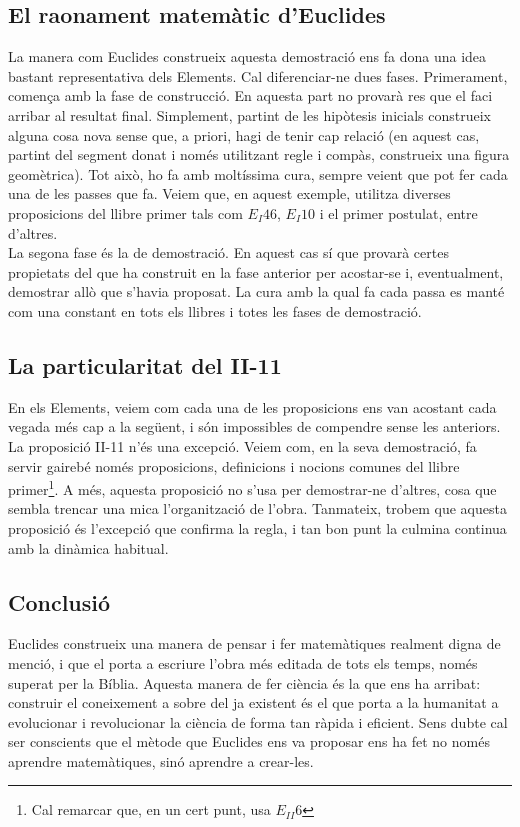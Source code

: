\documentclass[a4paper, 11pt]{article}
\begin{document}
\subsection*{El raonament matemàtic d'Euclides}
La manera com Euclides construeix aquesta demostració ens fa dona una idea bastant representativa dels Elements. Cal
diferenciar-ne dues fases. Primerament, comença amb la fase de construcció. En aquesta part no provarà res que el faci
arribar al resultat final. Simplement, partint de les hipòtesis inicials construeix alguna cosa nova sense que, a
priori, hagi de tenir cap relació (en aquest cas, partint del segment donat i només utilitzant regle i compàs,
construeix una figura geomètrica). Tot això, ho fa amb moltíssima cura, sempre veient que pot fer cada una de les
passes que fa. Veiem que, en aquest exemple, utilitza diverses proposicions del llibre primer tals com $E_I46$, $E_I10$
i el primer postulat, entre d'altres.\\
La segona fase és la de demostració. En aquest cas sí que provarà certes propietats del que ha construit en la fase
anterior per acostar-se i, eventualment, demostrar allò que s'havia proposat. La cura amb la qual fa cada passa es
manté com una constant en tots els llibres i totes les fases de demostració.

\subsection*{La particularitat del II-11}
En els Elements, veiem com cada una de les proposicions ens van acostant cada vegada més cap a la següent, i són
impossibles de compendre sense les anteriors. La proposició II-11 n'és una excepció. Veiem com, en la seva demostració,
fa servir gairebé només proposicions, definicions i nocions comunes del llibre primer\footnote{Cal remarcar que, en un
  cert punt, usa $E_{II}6$}. A més, aquesta proposició no s'usa per demostrar-ne d'altres, cosa que sembla trencar una
mica l'organització de l'obra. Tanmateix, trobem que aquesta proposició és l'excepció que confirma la regla, i tan bon
punt la culmina continua amb la dinàmica habitual.

\subsection*{Conclusió}
Euclides construeix una manera de pensar i fer matemàtiques realment digna de menció, i que el porta a escriure l'obra
més editada de tots els temps, només superat per la Bíblia. Aquesta manera de fer ciència és la que ens ha arribat:
construir el coneixement a sobre del ja existent és el que porta a la humanitat a evolucionar i revolucionar la ciència
de forma tan ràpida i eficient. Sens dubte cal ser conscients que el mètode que Euclides ens va proposar ens ha fet no
només aprendre matemàtiques, sinó aprendre a crear-les.
\end{document}
